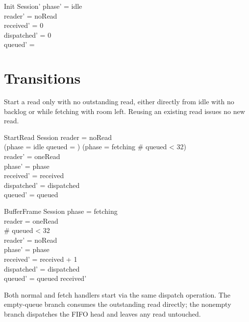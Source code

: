 \documentclass[a4paper,10pt,fleqn]{article}
\begin{document}
\begin{schema}{Init}
  Session'
  \where
  phase' = idle \\
  reader' = noRead \\
  received' = 0 \\
  dispatched' = 0 \\
  queued' = \langle \rangle
\end{schema}

\section{Transitions}

Start a read only with no outstanding read, either directly from idle
with no backlog or while fetching with room left. Reusing an existing
read issues no new read.

\begin{schema}{StartRead}
  \Delta Session
  \where
  reader = noRead \\
  (phase = idle \land queued = \langle \rangle) \lor
    (phase = fetching \land \# queued < 32) \\
  reader' = oneRead \\
  phase' = phase \\
  received' = received \\
  dispatched' = dispatched \\
  queued' = queued
\end{schema}

\begin{schema}{BufferFrame}
  \Delta Session
  \where
  phase = fetching \\
  reader = oneRead \\
  \# queued < 32 \\
  reader' = noRead \\
  phase' = phase \\
  received' = received + 1 \\
  dispatched' = dispatched \\
  queued' = queued \cat \langle received' \rangle
\end{schema}

Both normal and fetch handlers start via the same dispatch operation.
The empty-queue branch consumes the outstanding read directly; the
nonempty branch dispatches the FIFO head and leaves any read untouched.
\end{document}
